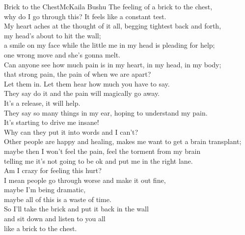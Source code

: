 
\begin{poetry}{Brick to the Chest}{McKaila Bushu}
The feeling of a brick to the chest,\\
why do I go through this? It feels like a constant test.\\
My heart aches at the thought of it all, begging tightest back and forth,\\
my head's about to hit the wall;\\
a smile on my face while the little me in my head is pleading for help;\\
one wrong move and she's gonna melt.\\
Can anyone see how much pain is in my heart, in my head, in my body;\\
that strong pain, the pain of when we are apart?\\
Let them in. Let them hear how much you have to say.\\
They say do it and the pain will magically go away.\\
It's a release, it will help.\\
They say so many things in my ear, hoping to understand my pain.\\
It's starting to drive me insane!\\
Why can they put it into words and I can't?\\
Other people are happy and healing, makes me want to get a brain transplant;\\
maybe then I won't feel the pain, feel the torment from my brain\\
telling me it's not going to be ok and put me in the right lane.\\
Am I crazy for feeling this hurt?\\
I mean people go through worse and make it out fine,\\
maybe I'm being dramatic,\\
maybe all of this is a waste of time.\\
So I'll take the brick and put it back in the wall\\
and sit down and listen to you all\\
like a brick to the chest.
\end{poetry}


